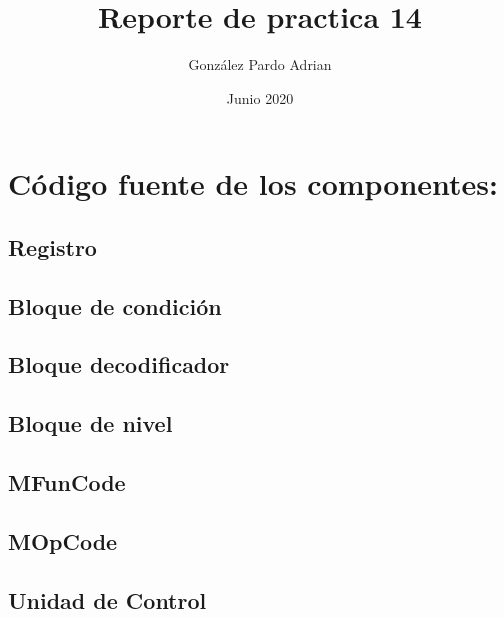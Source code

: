 \documentclass[8pt,executivepaper]{article}
\author{González Pardo Adrian}
\date{Junio 2020}
\title{Reporte de practica 14}
\begin{document}
\maketitle

\section{Código fuente de los componentes:}
\subsection{Registro}
\begin{center}
  
\end{center}
\subsection{Bloque de condición}
\begin{center}
  
\end{center}
\subsection{Bloque decodificador}
\begin{center}
  
\end{center}
\subsection{Bloque de nivel}
\begin{center}
  
\end{center}
\subsection{MFunCode}
\begin{center}
  
\end{center}
\subsection{MOpCode}
\begin{center}
  
\end{center}
\subsection{Unidad de Control}
\begin{center}
  
\end{center}
\end{document}
